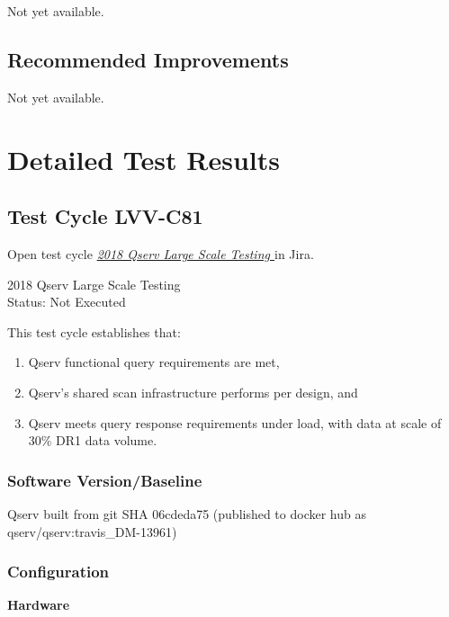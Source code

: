 \documentclass[DM,lsstdraft,STR,toc]{lsstdoc}
\providecommand{\tightlist}{
  \setlength{\itemsep}{0pt}\setlength{\parskip}{0pt}}
\begin{document}
Not yet available.

\subsection{Recommended Improvements}
\label{sect:recommendations}

Not yet available.

\newpage
\section{Detailed Test Results}
\label{sect:detailedtestresults}


  \subsection{Test Cycle LVV-C81 }

Open test cycle {\it \href{https://jira.lsstcorp.org/secure/Tests.jspa#/testrun/LVV-C81}{2018 Qserv Large Scale Testing
}} in Jira.

  2018 Qserv Large Scale Testing
\\
  Status: Not Executed

  This test cycle establishes that:\\

\begin{enumerate}
\tightlist
\item
  Qserv functional query requirements are met,~
\item
  Qserv's shared scan infrastructure performs per design, and
\item
  Qserv meets query response requirements under load, with data at scale
  of 30\% DR1 data volume.
\end{enumerate}


  \subsubsection{Software Version/Baseline}
    Qserv built from git SHA 06cdeda75 (published to docker hub as
qserv/qserv:travis\_DM-13961)


  \subsubsection{Configuration}
    \textbf{Hardware}\\
\end{document}
